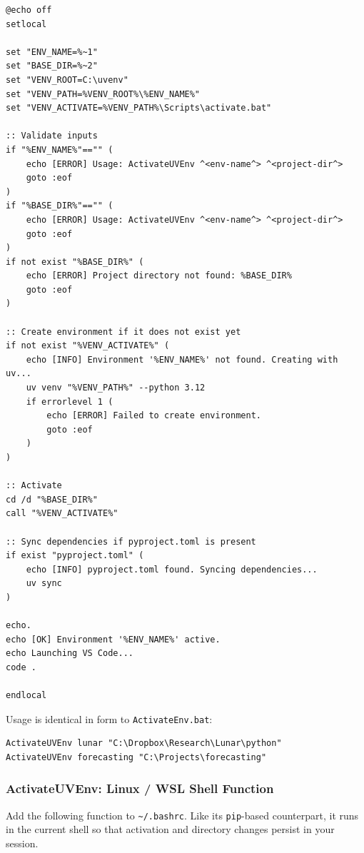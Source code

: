 \begin{lstlisting}[style=windowsStyle, basicstyle=\footnotesize\ttfamily, caption={\texttt{ActivateUVEnv.bat}: uv environment launcher (Windows)}]
@echo off
setlocal

set "ENV_NAME=%~1"
set "BASE_DIR=%~2"
set "VENV_ROOT=C:\uvenv"
set "VENV_PATH=%VENV_ROOT%\%ENV_NAME%"
set "VENV_ACTIVATE=%VENV_PATH%\Scripts\activate.bat"

:: Validate inputs
if "%ENV_NAME%"=="" (
    echo [ERROR] Usage: ActivateUVEnv ^<env-name^> ^<project-dir^>
    goto :eof
)
if "%BASE_DIR%"=="" (
    echo [ERROR] Usage: ActivateUVEnv ^<env-name^> ^<project-dir^>
    goto :eof
)
if not exist "%BASE_DIR%" (
    echo [ERROR] Project directory not found: %BASE_DIR%
    goto :eof
)

:: Create environment if it does not exist yet
if not exist "%VENV_ACTIVATE%" (
    echo [INFO] Environment '%ENV_NAME%' not found. Creating with uv...
    uv venv "%VENV_PATH%" --python 3.12
    if errorlevel 1 (
        echo [ERROR] Failed to create environment.
        goto :eof
    )
)

:: Activate
cd /d "%BASE_DIR%"
call "%VENV_ACTIVATE%"

:: Sync dependencies if pyproject.toml is present
if exist "pyproject.toml" (
    echo [INFO] pyproject.toml found. Syncing dependencies...
    uv sync
)

echo.
echo [OK] Environment '%ENV_NAME%' active.
echo Launching VS Code...
code .

endlocal
\end{lstlisting}

Usage is identical in form to \texttt{ActivateEnv.bat}:

\begin{lstlisting}[style=windowsStyle]
ActivateUVEnv lunar "C:\Dropbox\Research\Lunar\python"
ActivateUVEnv forecasting "C:\Projects\forecasting"
\end{lstlisting}

\subsubsection{ActivateUVEnv: Linux / WSL Shell Function}

Add the following function to \texttt{\textasciitilde/.bashrc}. Like
its \texttt{pip}-based counterpart, it runs in the current shell so
that activation and directory changes persist in your session.

